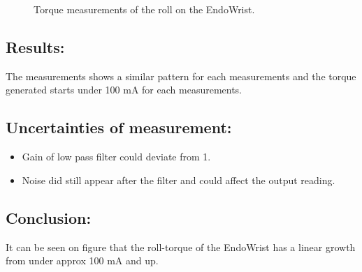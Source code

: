 \begin{figure}

\caption{Torque measurements of the roll on the EndoWrist.}
\label{fig_roll_mes}
\end{figure}




\subsection*{Results:}
The measurements shows a similar pattern for each measurements and the torque generated starts under 100 mA for each measurements.




%

\subsection*{Uncertainties of measurement:}
\begin{itemize}
\item Gain of low pass filter could deviate from 1.
\item Noise did still appear after the filter and could affect the output reading.
\end{itemize}

\subsection*{Conclusion:}
It can be seen on figure  that the roll-torque of the EndoWrist has a linear growth from under approx 100 mA and up.

